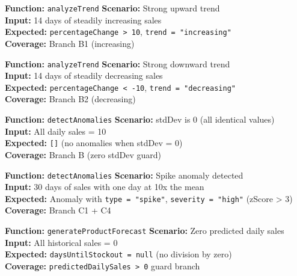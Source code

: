 ﻿\documentclass[12pt,a4paper]{report}
\newcommand{\ptwo}{\textbf{\color{p2orange}P2}}
\begin{document}
\begin{tcolorbox}[testbox,title={FORE-008 \hfill \ptwo}]
\textbf{Function:} \texttt{analyzeTrend} \quad \textbf{Scenario:} Strong upward trend \\
\textbf{Input:} 14 days of steadily increasing sales \\
\textbf{Expected:} \texttt{percentageChange > 10}, \texttt{trend = "increasing"} \\
\textbf{Coverage:} Branch B1 (increasing)
\end{tcolorbox}

\begin{tcolorbox}[testbox,title={FORE-009 \hfill \ptwo}]
\textbf{Function:} \texttt{analyzeTrend} \quad \textbf{Scenario:} Strong downward trend \\
\textbf{Input:} 14 days of steadily decreasing sales \\
\textbf{Expected:} \texttt{percentageChange < -10}, \texttt{trend = "decreasing"} \\
\textbf{Coverage:} Branch B2 (decreasing)
\end{tcolorbox}

\begin{tcolorbox}[testbox,title={FORE-010 \hfill \ptwo}]
\textbf{Function:} \texttt{detectAnomalies} \quad \textbf{Scenario:} stdDev is 0 (all identical values) \\
\textbf{Input:} All daily sales = 10 \\
\textbf{Expected:} \texttt{[]} (no anomalies when stdDev = 0) \\
\textbf{Coverage:} Branch B (zero stdDev guard)
\end{tcolorbox}

\begin{tcolorbox}[testbox,title={FORE-011 \hfill \ptwo}]
\textbf{Function:} \texttt{detectAnomalies} \quad \textbf{Scenario:} Spike anomaly detected \\
\textbf{Input:} 30 days of sales with one day at 10x the mean \\
\textbf{Expected:} Anomaly with \texttt{type = "spike"}, \texttt{severity = "high"} (zScore > 3) \\
\textbf{Coverage:} Branch C1 + C4
\end{tcolorbox}

\begin{tcolorbox}[testbox,title={FORE-012 \hfill \ptwo}]
\textbf{Function:} \texttt{generateProductForecast} \quad \textbf{Scenario:} Zero predicted daily sales \\
\textbf{Input:} All historical sales = 0 \\
\textbf{Expected:} \texttt{daysUntilStockout = null} (no division by zero) \\
\textbf{Coverage:} \texttt{predictedDailySales > 0} guard branch
\end{tcolorbox}
\end{document}
